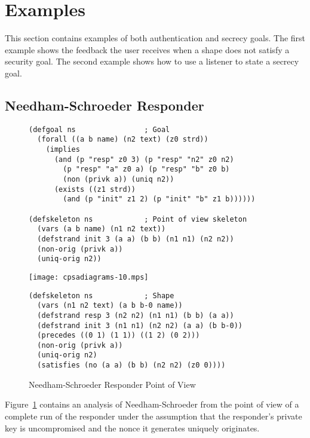 \documentclass[12pt]{article}
\begin{document}
\section{Examples}\label{sec:examples}

This section contains examples of both authentication and secrecy
goals.  The first example shows the feedback the user receives when a
shape does not satisfy a security goal.  The second example shows how
to use a listener to state a secrecy goal.

\subsection{Needham-Schroeder Responder}\label{sec:ns resp}

\begin{figure}
\begin{verbatim}
(defgoal ns                ; Goal
  (forall ((a b name) (n2 text) (z0 strd))
    (implies
      (and (p "resp" z0 3) (p "resp" "n2" z0 n2)
        (p "resp" "a" z0 a) (p "resp" "b" z0 b)
        (non (privk a)) (uniq n2))
      (exists ((z1 strd))
        (and (p "init" z1 2) (p "init" "b" z1 b))))))

(defskeleton ns            ; Point of view skeleton
  (vars (a b name) (n1 n2 text))
  (defstrand init 3 (a a) (b b) (n1 n1) (n2 n2))
  (non-orig (privk a))
  (uniq-orig n2))
\end{verbatim}
\begin{center}
\texttt{[image: cpsadiagrams-10.mps]}
\end{center}
\begin{verbatim}
(defskeleton ns            ; Shape
  (vars (n1 n2 text) (a b b-0 name))
  (defstrand resp 3 (n2 n2) (n1 n1) (b b) (a a))
  (defstrand init 3 (n1 n1) (n2 n2) (a a) (b b-0))
  (precedes ((0 1) (1 1)) ((1 2) (0 2)))
  (non-orig (privk a))
  (uniq-orig n2)
  (satisfies (no (a a) (b b) (n2 n2) (z0 0))))
\end{verbatim}
\caption{Needham-Schroeder Responder Point of View}
\label{fig:ns resp}
\end{figure}

Figure~\ref{fig:ns resp} contains an analysis of Needham-Schroeder
from the point of view of a complete run of the responder under the
assumption that the responder's private key is uncompromised and the
nonce it generates uniquely originates.
\end{document}
